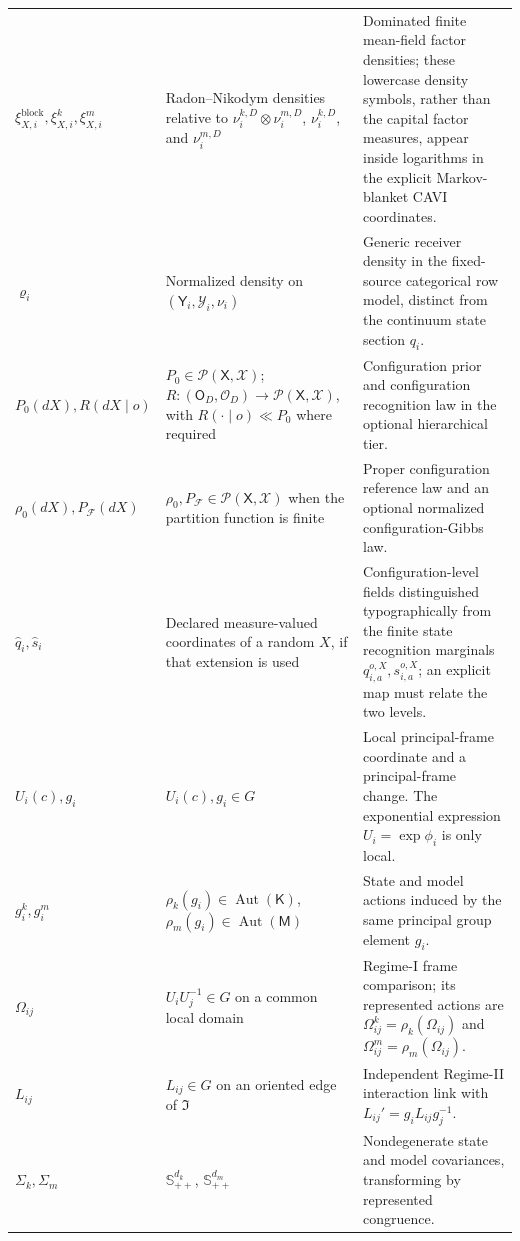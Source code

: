 \begin{longtable}{>{\raggedright\arraybackslash}p{}>{\raggedright\arraybackslash}p{}>{\raggedright\arraybackslash}p{}}
\(\xi^{\mathrm{block}}_{X,i},\xi^k_{X,i},\xi^m_{X,i}\) &
Radon--Nikodym densities relative to \(\nu_i^{k,D}\otimes\nu_i^{m,D}\), \(\nu_i^{k,D}\), and \(\nu_i^{m,D}\) &
Dominated finite mean-field factor densities; these lowercase density symbols, rather than the capital factor measures, appear inside logarithms in the explicit Markov-blanket CAVI coordinates.\\
\(\varrho_i\) &
Normalized density on \((\mathsf Y_i,\mathscr Y_i,\nu_i)\) &
Generic receiver density in the fixed-source categorical row model, distinct from the continuum state section \(q_i\).\\
\(P_0(dX),R(dX\mid o)\) &
\(P_0\in\mathcal P(\mathsf X,\mathscr X)\); \(R:(\mathsf O_D,\mathscr O_D)\to\mathcal P(\mathsf X,\mathscr X)\), with \(R(\mathord\cdot\mid o)\ll P_0\) where required &
Configuration prior and configuration recognition law in the optional hierarchical tier.\\
\(\rho_0(dX),P_{\mathcal F}(dX)\) &
\(\rho_0,P_{\mathcal F}\in\mathcal P(\mathsf X,\mathscr X)\) when the partition function is finite &
Proper configuration reference law and an optional normalized configuration-Gibbs law.\\
\(\widehat q_i,\widehat s_i\) &
Declared measure-valued coordinates of a random \(X\), if that extension is used &
Configuration-level fields distinguished typographically from the finite state recognition marginals \(q_{i,a}^{o,X},s_{i,a}^{o,X}\); an explicit map must relate the two levels.\\
\(U_i(c),g_i\) &
\(U_i(c),g_i\in G\) &
Local principal-frame coordinate and a principal-frame change. The exponential expression \(U_i=\exp\phi_i\) is only local.\\
\(g_i^k,g_i^m\) &
\(\rho_k(g_i)\in\operatorname{Aut}(\mathsf K)\), \(\rho_m(g_i)\in\operatorname{Aut}(\mathsf M)\) &
State and model actions induced by the same principal group element \(g_i\).\\
\(\Omega_{ij}\) &
\(U_iU_j^{-1}\in G\) on a common local domain &
Regime-I frame comparison; its represented actions are \(\Omega_{ij}^{k}=\rho_k(\Omega_{ij})\) and \(\Omega_{ij}^{m}=\rho_m(\Omega_{ij})\).\\
\(L_{ij}\) &
\(L_{ij}\in G\) on an oriented edge of \(\mathfrak I\) &
Independent Regime-II interaction link with \(L_{ij}'=g_iL_{ij}g_j^{-1}\).\\
\(\Sigma_k,\Sigma_m\) &
\(\mathbb S_{++}^{d_k}\), \(\mathbb S_{++}^{d_m}\) &
Nondegenerate state and model covariances, transforming by represented congruence.\\

\end{longtable}
